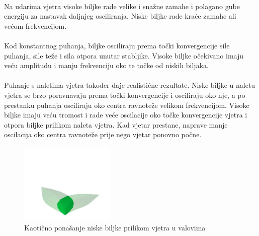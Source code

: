 \documentclass[times, utf8, diplomski]{fer}
\begin{document}
\paragraph{}
Na udarima vjetra visoke biljke rade velike i snažne zamahe i polagano gube 
energiju za nastavak daljnjeg osciliranja. Niske biljke rade kraće zamahe ali 
većom frekvencijom.
\paragraph{}
Kod konstantnog puhanja, biljke osciliraju prema točki konvergencije sile 
puhanja, sile teže i sila otpora unutar stabljike. Visoke biljke očekivano imaju veću 
amplitudu i manju frekvenciju oko te točke od niskih biljaka.
\paragraph{}
Puhanje s naletima vjetra također daje realistične rezultate. Niske biljke u 
naletu vjetra se brzo poravnavaju prema točki konvergencije i osciliraju oko 
nje, a po prestanku puhanja osciliraju oko centra ravnoteže velikom 
frekvencijom. Visoke biljke imaju veću tromost i rade veće oscilacije oko točke
konvergencije vjetra i otpora biljke prilikom naleta vjetra. Kad vjetar 
prestane, naprave manje oscilacija oko centra ravnoteže prije nego vjetar 
ponovno počne.
\begin{figure}[h]
	\centering
	\includegraphics[width=0.4\textwidth]{img/52-1}
	\caption{Kaotično ponašanje niske biljke prilikom vjetra u valovima}
	\label{fig:52-1}
\end{figure}
\end{document}
